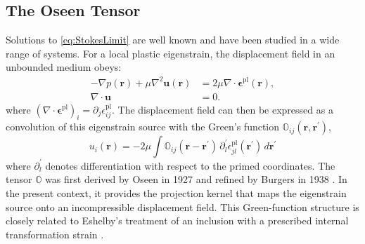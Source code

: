 
\subsection{The Oseen Tensor} \label{sec:Oseen}
Solutions to \cref{eq:StokesLimit} are well known and have been studied in a wide range of systems. For a local plastic eigenstrain, the displacement field in an unbounded medium obeys:
\begin{subequations}
\label{eq:Stokes}
\begin{align}
- \nabla p(\bm{r}) + \mu \nabla^2 \bm{u}(\bm{r}) &= 2\mu \nabla \cdot \bm{\epsilon}^{\mathrm{pl}}(\bm{r}), \label{eq:Stokes1} \\
\nabla \cdot \bm{u} &= 0. \label{eq:Stokes2}
\end{align}
\end{subequations}
where $(\nabla \cdot \bm{\epsilon}^{\mathrm{pl}})_i = \partial_j \epsilon^{\mathrm{pl}}_{ij}$. The displacement field can then be expressed as a convolution of this eigenstrain source with the Green's function $\mathbb{O}_{ij}(\bm{r},\bm{r}^\prime)$,
\begin{equation}
    u_i(\bm{r}) = -2\mu \int \mathbb{O}_{ij}(\bm{r}-\bm{r}^\prime)\,\partial_l^\prime \epsilon_{jl}^{\mathrm{pl}}(\bm{r}^\prime)\, d\bm{r}^\prime
\end{equation}
where $\partial_l^\prime$ denotes differentiation with respect to the primed coordinates.
The tensor $\bm{\mathbb{O}}$ was first derived by Oseen in 1927 \cite{oseen_neuere_1927} and refined by Burgers in 1938 \cite{Burgers1939}. In the present context, it provides the projection kernel that maps the eigenstrain source onto an incompressible displacement field. This Green-function structure is closely related to Eshelby's treatment of an inclusion with a prescribed internal transformation strain \cite{eshelby_determination_1997}.


